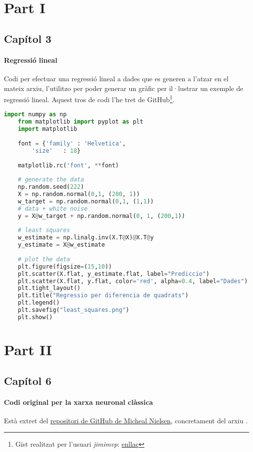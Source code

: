 \section{Part I}
\subsection{Capítol 3}

\paragraph{Regressió lineal}
\label{lst:linear_regression}
Codi per efectuar una regressió lineal a dades que es generen a l'atzar en el mateix arxiu, l'utilitzo per poder generar un gràfic per il·lustrar un exemple de regressió lineal. Aquest tros de codi l'he tret de GitHub\footnote{Gist realitzat per l'usuari \textit{jimimvp}: \href{https://gist.github.com/jimimvp/05ece11fec25d5c8c009af9ba469d6c2}{enllaç}}.

\begin{lstlisting}[language=Python, caption=Regressió lineal]
	import numpy as np
	from matplotlib import pyplot as plt
	import matplotlib
	
	font = {'family' : 'Helvetica',
		'size'   : 18}
	
	matplotlib.rc('font', **font)
	
	# generate the data
	np.random.seed(222)
	X = np.random.normal(0,1, (200, 1))
	w_target = np.random.normal(0,1, (1,1))
	# data + white noise
	y = X@w_target + np.random.normal(0, 1, (200,1))
	
	# least squares
	w_estimate = np.linalg.inv(X.T@X)@X.T@y
	y_estimate = X@w_estimate
	
	# plot the data
	plt.figure(figsize=(15,10))
	plt.scatter(X.flat, y_estimate.flat, label="Prediccio")
	plt.scatter(X.flat, y.flat, color='red', alpha=0.4, label="Dades")
	plt.tight_layout()
	plt.title("Regressio per diferencia de quadrats")
	plt.legend()
	plt.savefig("least_squares.png")
	plt.show()
\end{lstlisting}

\section{Part II}
\subsection{Capítol 6}

\paragraph{Codi original per la xarxa neuronal clàssica}
\label{lst:disc_original}
Està extret del \href{https://github.com/mnielsen/neural-networks-and-deep-learning}{repositori de GitHub de Micheal Nielsen}, concretament del arxiu .


